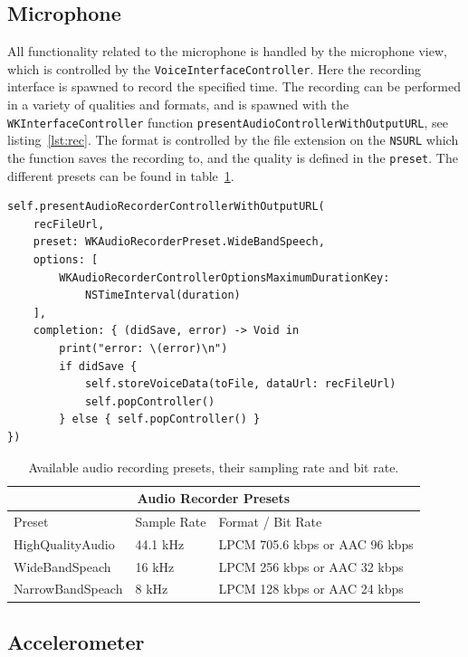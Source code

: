 \subsection{Microphone}
All functionality related to the microphone is handled by the microphone view,
which is controlled by the \texttt{VoiceInterfaceController}.
Here the recording interface is spawned to record the specified time. The
recording can be performed in a variety of qualities and formats, and is spawned
with the \texttt{WKInterfaceController} function
\texttt{presentAudioControllerWithOutputURL}, see listing~\ref{lst:rec}. The format is
controlled by the file extension on the \texttt{NSURL} which the function saves
the recording to, and the quality is defined in the \texttt{preset}. The
different presets can be found in table~\ref{tbl:rec}.

\begin{lstlisting}[label={lst:rec}, caption={Spawning of the audio recording
    controller.},basicstyle=\small]
self.presentAudioRecorderControllerWithOutputURL(
    recFileUrl,
    preset: WKAudioRecorderPreset.WideBandSpeech,
    options: [
        WKAudioRecorderControllerOptionsMaximumDurationKey: 
            NSTimeInterval(duration)
    ],
    completion: { (didSave, error) -> Void in
        print("error: \(error)\n")
        if didSave {
            self.storeVoiceData(toFile, dataUrl: recFileUrl)
            self.popController()
        } else { self.popController() }
})
\end{lstlisting}

\begin{table}[!h]
\caption{Available audio recording presets, their sampling rate and bit rate.}
\label{tbl:rec}
\centering
\begin{tabular}{ |l|l|l|  }
\hline
\multicolumn{3}{|c|}{Audio Recorder Presets} \\
\hline
Preset             & Sample Rate & Format / Bit Rate\\
\hline
HighQualityAudio   & 44.1 kHz    & LPCM 705.6 kbps or AAC 96 kbps \\
WideBandSpeach     & 16 kHz      & LPCM 256 kbps or AAC 32 kbps \\
NarrowBandSpeach   & 8 kHz       & LPCM 128 kbps or AAC 24 kbps \\
\hline
\end{tabular}
\end{table}

\subsection{Accelerometer}


